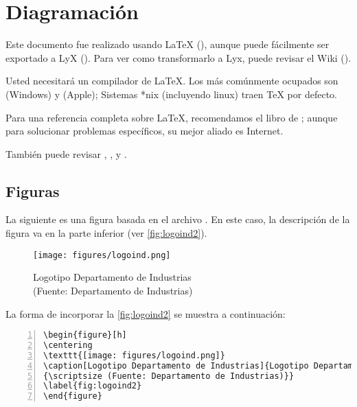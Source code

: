 \section{Diagramación}
Este documento fue realizado usando \LaTeX{} (\citet{latex:whatis}), aunque puede fácilmente ser exportado a LyX (\citeauthor{lyx}). Para ver como transformarlo a Lyx, puede revisar el Wiki (\citeauthor{wikilyx}).

Usted necesitará un compilador de \LaTeX. Los más comúnmente ocupados son \citeauthor{miktex} (Windows) y \citeauthor{mactex} (Apple); Sistemas *nix (incluyendo linux) traen \TeX{} por defecto.

Para una referencia completa sobre \LaTeX{}, recomendamos el libro de \cite{Lamport94}; aunque para solucionar problemas específicos, su mejor aliado es Internet.

También puede revisar \citet{Roberts05}, \citet{Oetiker06}, y \citet{Mittelbach04}.

\subsection{Figuras}
La siguiente es una figura basada en el archivo . En este caso, la descripción de la figura va en la parte inferior (ver \autoref{fig:logoind2}).

\begin{figure}[ht!]
\centering
\texttt{[image: figures/logoind.png]}
\caption[Logotipo Departamento de Industrias]{Logotipo Departamento de Industrias\\
{\scriptsize (Fuente: Departamento de Industrias)}}
\label{fig:logoind2}
\end{figure}

La forma de incorporar la \autoref{fig:logoind2} se muestra a continuación:


\begin{Verbatim}[frame=lines, label=Incorporar \autoref{fig:logoind2}
				, fontsize=\footnotesize, numbers=left
				, baselinestretch=1
				, formatcom=\color{gray}]
\begin{figure}[h]
\centering
\texttt{[image: figures/logoind.png]}
\caption[Logotipo Departamento de Industrias]{Logotipo Departamento de Industrias\\
{\scriptsize (Fuente: Departamento de Industrias)}}
\label{fig:logoind2}
\end{figure}
\end{Verbatim}

